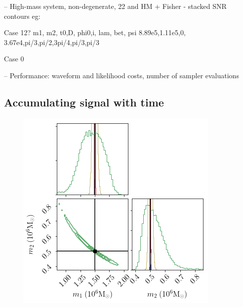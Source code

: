 \documentclass[aps,showpacs,twocolumn,prd,superscriptaddress,nofootinbib]{revtex4-1}
\begin{document}
-- High-mass system, non-degenerate, 22 and HM + Fisher - stacked SNR contours
eg:

Case 12?
m1,    m2,    t0,D,     phi0,i,   lam,  bet, psi
8.89e5,1.11e5,0, 3.67e4,pi/3,pi/2,3pi/4,pi/3,pi/3

Case 0

-- Performance: waveform and likelihood costs, number of sampler evaluations


\subsection{Accumulating signal with time}
\label{sec:SMBHPEacctime}

\begin{figure}
  \centering
  \begin{minipage}{.32\linewidth}
      \includegraphics[width=.99\linewidth]{../plots/corner_smbh_case9_hm_tseries_m1m2.png}
   \end{minipage}
   \begin{minipage}{.32\linewidth}

\end{minipage}
\end{figure}
\end{document}
